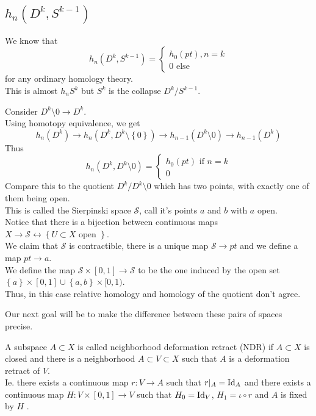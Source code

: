 \documentclass[../main.tex]{subfiles}
\begin{document}
\subsection*{$ h_n( D^{k},S^{k-1}) $ }

\begin{exemple}
We know that 
\[ 
h_n( D^{k},S^{k-1}) = 
\begin{cases}
	h_0( pt) , n =k \\
	0 \text{ else } 
\end{cases}
\]
for any ordinary homology theory.\\
This is almost $h_n S^{k}$ but $S^{k}$ is the collapse $ D^{k} /S^{k-1}$.
\end{exemple}
\begin{exemple}
	Consider $D^{k}\setminus 0 \to D^{k}$.\\
	Using homotopy equivalence, we get
	\[ 
	h_n( D^{k}) \to h_n( D^{k},D^{k}\setminus \left\{ 0 \right\} ) \to h_{n-1} ( D^{k}\setminus 0) \to h_{n-1} ( D^{k}) 
	\]
	Thus 
	\[ 
	h_n ( D^{k},D^{k}\setminus 0) =
	\begin{cases}
	h_0( pt) \text{ if } n=k\\
	0
	\end{cases}
	\]
	Compare this to the quotient $D^{k} / D^{k}\setminus 0$ which has two points, with exactly one of them being open.\\
	This is called the Sierpinski space $ \mathcal{S}$, call it's points $a$ and $b$ with $a$ open.\\
	Notice that there is a bijection between continuous maps $X\to \mathcal{S} \leftrightarrow \left\{ U \subset X \text{ open }  \right\} $.\\
	We claim that $\mathcal{S}$ 	is contractible, there is a unique map $\mathcal{S}\to pt$ and we define a map $pt \to a$.\\
	We define the map $\mathcal{S}\times [ 0,1] \to \mathcal{S}$ to be the one induced by the open set $ \left\{ a \right\} \times [ 0,1] \cup \left\{ a,b \right\} \times [ 0,1) $.\\
	Thus, in this case relative homology and homology of the quotient don't agree.
\end{exemple}
Our next goal will be to make the difference between these pairs of spaces precise.
\begin{defn}
	A subspace $A \subset X	$ is called neighborhood deformation retract (NDR)  if $A \subset X$ is closed and there is a neighborhood $A \subset V \subset X$ such that $A$ is a deformation retract of $V$.\\
	Ie. there exists a continuous map $r:V\to A$ such that $r|_A= \operatorname{Id}_A$ and there exists a continuous map $H:V\times [ 0,1] \to V$ such that $H_0= \operatorname{Id}_V$, $H_1= \iota\circ r$ and $A$ is fixed by $H$ .
\end{defn}
\end{document}
